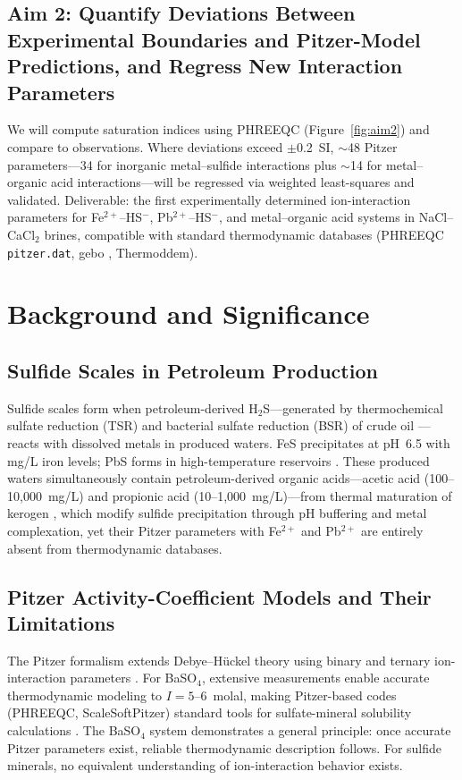\documentclass[12pt]{article}
\begin{document}
\subsection{Aim 2: Quantify Deviations Between Experimental Boundaries and Pitzer-Model Predictions, and Regress New Interaction Parameters}

We will compute saturation indices using PHREEQC (Figure~\ref{fig:aim2}) and compare to observations. Where deviations exceed $\pm$0.2~SI, $\sim$48 Pitzer parameters---34 for inorganic metal--sulfide interactions plus $\sim$14 for metal--organic acid interactions---will be regressed via weighted least-squares and validated. Deliverable: the first experimentally determined ion-interaction parameters for Fe$^{2+}$--HS$^-$, Pb$^{2+}$--HS$^-$, and metal--organic acid systems in NaCl--CaCl$_2$ brines, compatible with standard thermodynamic databases (PHREEQC \texttt{pitzer.dat}, gebo \cite{bozau2013}, Thermoddem).

\section{Background and Significance}

\subsection{Sulfide Scales in Petroleum Production}

Sulfide scales form when petroleum-derived H$_2$S---generated by thermochemical sulfate reduction (TSR) and bacterial sulfate reduction (BSR) of crude oil \cite{machel2001,worden1996}---reacts with dissolved metals in produced waters. FeS precipitates at pH~6.5 with mg/L iron levels; PbS forms in high-temperature reservoirs \cite{wylde2014,alharbi2017}. These produced waters simultaneously contain petroleum-derived organic acids---acetic acid (100--10{,}000~mg/L) and propionic acid (10--1{,}000~mg/L)---from thermal maturation of kerogen \cite{carothers1978,surdam1989}, which modify sulfide precipitation through pH buffering and metal complexation, yet their Pitzer parameters with Fe$^{2+}$ and Pb$^{2+}$ are entirely absent from thermodynamic databases.

\subsection{Pitzer Activity-Coefficient Models and Their Limitations}

The Pitzer formalism extends Debye--H\"uckel theory using binary and ternary ion-interaction parameters \cite{kan2019}. For BaSO$_4$, extensive measurements enable accurate thermodynamic modeling to $I = 5$--6~molal, making Pitzer-based codes (PHREEQC, ScaleSoftPitzer) standard tools for sulfate-mineral solubility calculations \cite{kan2019,shaferpeltier2020}. The BaSO$_4$ system demonstrates a general principle: once accurate Pitzer parameters exist, reliable thermodynamic description follows. For sulfide minerals, no equivalent understanding of ion-interaction behavior exists.
\end{document}
